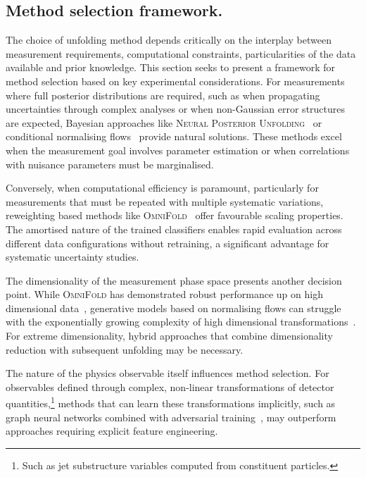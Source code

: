     \subsection{Method selection framework.}
        The choice of unfolding method depends critically on the interplay between measurement requirements, computational constraints, particularities of the data available and prior knowledge.
        This section seeks to present a framework for method selection based on key experimental considerations.
        For measurements where full posterior distributions are required, such as when propagating uncertainties through complex analyses or when non-Gaussian error structures are expected, Bayesian approaches like \textsc{Neural Posterior Unfolding}~\cite{acosta2024npu} or conditional normalising flows~\cite{Bellagente2020InvertibleAgain} provide natural solutions.
        These methods excel when the measurement goal involves parameter estimation or when correlations with nuisance parameters must be marginalised.
        
        Conversely, when computational efficiency is paramount, particularly for measurements that must be repeated with multiple systematic variations, reweighting based methods like \textsc{OmniFold}~\cite{andreassen_omnifold_2020} offer favourable scaling properties.
        The amortised nature of the trained classifiers enables rapid evaluation across different data configurations without retraining, a significant advantage for systematic uncertainty studies.

        The dimensionality of the measurement phase space presents another decision point.
        While \textsc{OmniFold} has demonstrated robust performance up on high dimensional data~\cite{andreassen_omnifold_2020}, generative models based on normalising flows can struggle with the exponentially growing complexity of high dimensional transformations~\cite{papamakarios_masked_2018}.
        For extreme dimensionality, hybrid approaches that combine dimensionality reduction with subsequent unfolding may be necessary.

        The nature of the physics observable itself influences method selection.
        For observables defined through complex, non-linear transformations of detector quantities,\footnote{Such as jet substructure variables computed from constituent particles.} methods that can learn these transformations implicitly, such as graph neural networks combined with adversarial training~\cite{Shlomi2020GraphPhysics}, may outperform approaches requiring explicit feature engineering.
        
